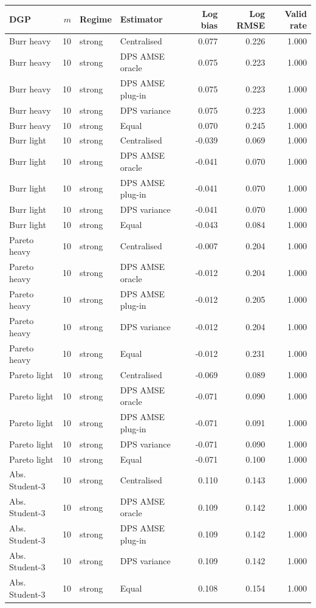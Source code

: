 \begin{tabular}{lrllrrr}
\toprule
DGP & $m$ & Regime & Estimator & Log bias & Log RMSE & Valid rate \\
\midrule
Burr heavy & 10 & strong & Centralised & 0.077 & 0.226 & 1.000 \\
Burr heavy & 10 & strong & DPS AMSE oracle & 0.075 & 0.223 & 1.000 \\
Burr heavy & 10 & strong & DPS AMSE plug-in & 0.075 & 0.223 & 1.000 \\
Burr heavy & 10 & strong & DPS variance & 0.075 & 0.223 & 1.000 \\
Burr heavy & 10 & strong & Equal & 0.070 & 0.245 & 1.000 \\
Burr light & 10 & strong & Centralised & -0.039 & 0.069 & 1.000 \\
Burr light & 10 & strong & DPS AMSE oracle & -0.041 & 0.070 & 1.000 \\
Burr light & 10 & strong & DPS AMSE plug-in & -0.041 & 0.070 & 1.000 \\
Burr light & 10 & strong & DPS variance & -0.041 & 0.070 & 1.000 \\
Burr light & 10 & strong & Equal & -0.043 & 0.084 & 1.000 \\
Pareto heavy & 10 & strong & Centralised & -0.007 & 0.204 & 1.000 \\
Pareto heavy & 10 & strong & DPS AMSE oracle & -0.012 & 0.204 & 1.000 \\
Pareto heavy & 10 & strong & DPS AMSE plug-in & -0.012 & 0.205 & 1.000 \\
Pareto heavy & 10 & strong & DPS variance & -0.012 & 0.204 & 1.000 \\
Pareto heavy & 10 & strong & Equal & -0.012 & 0.231 & 1.000 \\
Pareto light & 10 & strong & Centralised & -0.069 & 0.089 & 1.000 \\
Pareto light & 10 & strong & DPS AMSE oracle & -0.071 & 0.090 & 1.000 \\
Pareto light & 10 & strong & DPS AMSE plug-in & -0.071 & 0.091 & 1.000 \\
Pareto light & 10 & strong & DPS variance & -0.071 & 0.090 & 1.000 \\
Pareto light & 10 & strong & Equal & -0.071 & 0.100 & 1.000 \\
Abs. Student-3 & 10 & strong & Centralised & 0.110 & 0.143 & 1.000 \\
Abs. Student-3 & 10 & strong & DPS AMSE oracle & 0.109 & 0.142 & 1.000 \\
Abs. Student-3 & 10 & strong & DPS AMSE plug-in & 0.109 & 0.142 & 1.000 \\
Abs. Student-3 & 10 & strong & DPS variance & 0.109 & 0.142 & 1.000 \\
Abs. Student-3 & 10 & strong & Equal & 0.108 & 0.154 & 1.000 \\
\bottomrule
\end{tabular}
